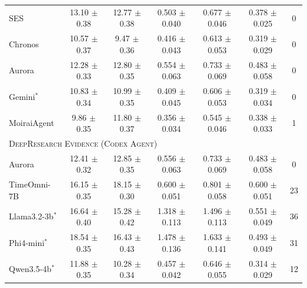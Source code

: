 \documentclass[]{servicenow}
\begin{document}
\begin{table}[h]
{\begin{tabular}{lcccccc}
\hspace{1.2em}SES                           & 13.10 $\pm$ 0.38          & 12.77 $\pm$ 0.38          & 0.503 $\pm$ 0.040          & 0.677 $\pm$ 0.046          & 0.378 $\pm$ 0.025          & 0  \\
\hspace{1.2em}Chronos                       & 10.57 $\pm$ 0.37 & 9.47 $\pm$ 0.36  & 0.416 $\pm$ 0.043 & 0.613 $\pm$ 0.053 & 0.319 $\pm$ 0.029 & 0  \\
\hspace{1.2em}Aurora                        & 12.28 $\pm$ 0.33          & 12.80 $\pm$ 0.35          & 0.554 $\pm$ 0.063          & 0.733 $\pm$ 0.069          & 0.483 $\pm$ 0.058          & 0  \\
\hspace{1.2em}Gemini$^\ast$                 & 10.83 $\pm$ 0.34          & 10.99 $\pm$ 0.35          & 0.409 $\pm$ 0.045 & 0.606 $\pm$ 0.053 & 0.319 $\pm$ 0.034 & 0  \\
\hspace{1.2em}MoiraiAgent                   & 9.86 $\pm$ 0.35  & 11.80 $\pm$ 0.37          & 0.356 $\pm$ 0.034 & 0.545 $\pm$ 0.046 & 0.338 $\pm$ 0.033 & 1  \\
\midrule
\multicolumn{7}{l}{\textsc{DeepResearch Evidence (Codex Agent)}} \\
\addlinespace[2pt]
\hspace{1.2em}Aurora                        & 12.41 $\pm$ 0.32          & 12.85 $\pm$ 0.35          & 0.556 $\pm$ 0.063          & 0.733 $\pm$ 0.069          & 0.483 $\pm$ 0.058          & 0  \\
\hspace{1.2em}TimeOmni-7B                   & 16.15 $\pm$ 0.35          & 18.15 $\pm$ 0.30          & 0.600 $\pm$ 0.051          & 0.801 $\pm$ 0.058          & 0.600 $\pm$ 0.051          & 23 \\
\hspace{1.2em}Llama3.2-3b$^\ast$            & 16.64 $\pm$ 0.40          & 15.28 $\pm$ 0.42          & 1.318 $\pm$ 0.113          & 1.496 $\pm$ 0.113          & 0.551 $\pm$ 0.049          & 36 \\
\hspace{1.2em}Phi4-mini$^\ast$              & 18.54 $\pm$ 0.35          & 16.43 $\pm$ 0.43          & 1.478 $\pm$ 0.136          & 1.633 $\pm$ 0.141          & 0.493 $\pm$ 0.049          & 31 \\
\hspace{1.2em}Qwen3.5-4b$^\ast$             & 11.88 $\pm$ 0.35          & 10.28 $\pm$ 0.34          & 0.457 $\pm$ 0.042          & 0.646 $\pm$ 0.055          & 0.314 $\pm$ 0.029 & 12 \\

\end{tabular}}
\end{table}
\end{document}
